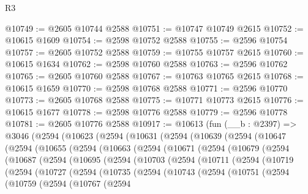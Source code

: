 \begin{lexlean}{R3}
\begin{coremodule}
@10749 := @2605 @10744 @2588
@10751 := @10747 @10749 @2615
@10752 := @10615 @1609
@10754 := @2598 @10752 @2588
@10755 := @2596 @10754
@10757 := @2605 @10752 @2588
@10759 := @10755 @10757 @2615
@10760 := @10615 @1634
@10762 := @2598 @10760 @2588
@10763 := @2596 @10762
@10765 := @2605 @10760 @2588
@10767 := @10763 @10765 @2615
@10768 := @10615 @1659
@10770 := @2598 @10768 @2588
@10771 := @2596 @10770
@10773 := @2605 @10768 @2588
@10775 := @10771 @10773 @2615
@10776 := @10615 @1677
@10778 := @2598 @10776 @2588
@10779 := @2596 @10778
@10781 := @2605 @10776 @2588
@10917 := @10613
    (fun (__b : @2397) =>
    @3046
      (@2594
        (@10623
          (@2594
            (@10631
              (@2594
                (@10639
                  (@2594
                    (@10647
                      (@2594
                        (@10655
                          (@2594
                            (@10663
                              (@2594
                                (@10671
                                  (@2594
                                    (@10679
                                      (@2594
                                        (@10687
                                          (@2594
                                            (@10695
                                              (@2594
                                                (@10703
                                                  (@2594
                                                    (@10711
                                                      (@2594
                                                        (@10719
                                                          (@2594
                                                            (@10727
                                                              (@2594
                                                                (@10735
                                                                  (@2594
                                                                    (@10743
                                                                      (@2594
                                                                        (@10751
                                                                          (@2594
                                                                            (@10759
                                                                              (@2594
                                                                                (@10767
                                                                                  (@2594

\end{coremodule}
\end{lexlean}
